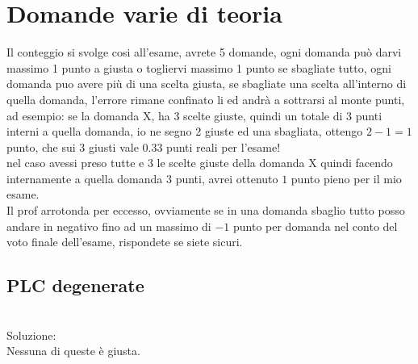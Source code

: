 \documentclass{article}
\begin{document}
\newpage
\section{Domande varie di teoria}
Il conteggio si svolge cosi all'esame, avrete 5 domande, ogni domanda può darvi massimo 1 punto a giusta o togliervi massimo 1 punto se sbagliate tutto, ogni domanda puo avere più di una scelta giusta, se sbagliate una scelta all'interno di quella domanda, l'errore rimane confinato li ed andrà a sottrarsi al monte punti, ad esempio: se la domanda X, ha 3 scelte giuste, quindi un totale di 3 punti interni a quella domanda, io ne segno 2 giuste ed una sbagliata, ottengo $2-1 = 1$ punto, che sui 3 giusti vale $0.33$ punti reali per l'esame!\\
nel caso avessi preso tutte e 3 le scelte giuste della domanda X quindi facendo internamente a quella domanda $3$ punti, avrei ottenuto $1$ punto pieno per il mio esame.\\
Il prof arrotonda per eccesso, ovviamente se in una domanda sbaglio tutto posso andare in negativo fino ad un massimo di $-1$ punto per domanda nel conto del voto finale dell'esame, rispondete se siete sicuri.
\subsection{PLC degenerate}
\noindent{}%
\\
Soluzione:\\
Nessuna di queste è giusta.
\end{document}
